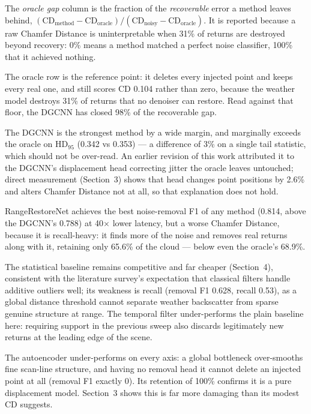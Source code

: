 \documentclass[12pt,a4paper]{article}
\begin{document}
The \emph{oracle gap} column is the fraction of the \emph{recoverable}
error a method leaves behind,
$(\mathrm{CD}_{\text{method}}-\mathrm{CD}_{\text{oracle}})/
(\mathrm{CD}_{\text{noisy}}-\mathrm{CD}_{\text{oracle}})$. It is reported
because a raw Chamfer Distance is uninterpretable when 31\% of returns are
destroyed beyond recovery: 0\% means a method matched a perfect noise
classifier, 100\% that it achieved nothing.

The oracle row is the reference point: it deletes every injected point and
keeps every real one, and still scores CD 0.104 rather than zero, because
the weather model destroys 31\% of returns that no denoiser can restore.
Read against that floor, the DGCNN has closed 98\% of the recoverable gap.

The DGCNN is the strongest method by a wide margin, and marginally exceeds
the oracle on HD$_{95}$ (0.342 vs 0.353) --- a difference of 3\% on a single
tail statistic, which should not be over-read. An earlier revision of this
work attributed it to the DGCNN's displacement head correcting jitter the
oracle leaves untouched; direct measurement (Section~3) shows that head
changes point positions by 2.6\% and alters Chamfer Distance not at all, so
that explanation does not hold.

RangeRestoreNet achieves the best noise-removal F1 of any method (0.814,
above the DGCNN's 0.788) at 40$\times$ lower latency, but a worse Chamfer
Distance, because it is recall-heavy: it finds more of the noise and removes
real returns along with it, retaining only 65.6\% of the cloud --- below even
the oracle's 68.9\%.

The statistical baseline remains competitive and far cheaper (Section~4),
consistent with the literature survey's expectation that classical filters
handle additive outliers well; its weakness is recall (removal F1 0.628,
recall 0.53), as a global distance threshold cannot separate weather
backscatter from sparse genuine structure at range. The temporal filter
under-performs the plain baseline here: requiring support in the previous
sweep also discards legitimately new returns at the leading edge of the
scene.

The autoencoder under-performs on every axis: a global bottleneck
over-smooths fine scan-line structure, and having no removal head it cannot
delete an injected point at all (removal F1 exactly 0). Its retention of
100\% confirms it is a pure displacement model. Section~3 shows this is far
more damaging than its modest CD suggests.
\end{document}
